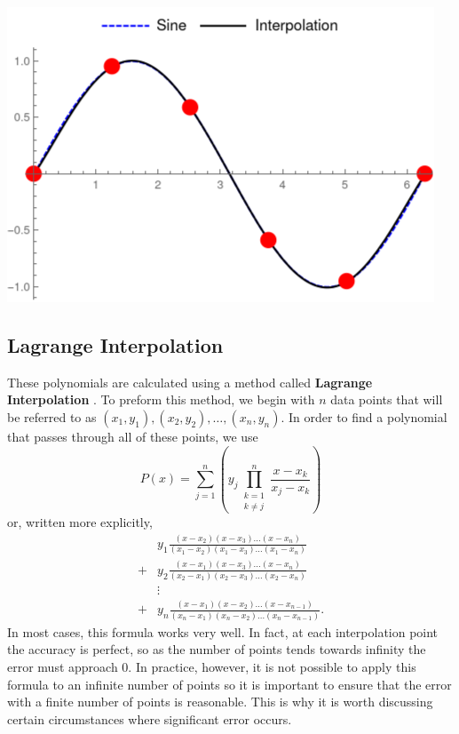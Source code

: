\documentclass{article}
\begin{document}
{\begin{minipage}{0.3\textwidth}
        \includegraphics[width=\linewidth]{Images/SineInterpolation_EvenlySpaced/sin_interpolation_6.png}
        \captionsetup{justification=centering}
    \end{minipage}
}
\medbreak
\subsection{Lagrange Interpolation}

These polynomials are calculated using a method called \textbf{Lagrange Interpolation} \cite{enwiki:lagrange_polynomial}\cite{mathworld:lagrange_polynomial}. To preform this method, we begin with $n$ data points that will be referred to as $(x_1, y_1), (x_2, y_2), \ldots, (x_n, y_n)$. In order to find a polynomial that passes through all of these points, we use
\begin{equation}
    P(x) = \sum_{j=1}^n\left(y_j\prod_{\substack{k=1 \\ k\neq j}}^n \frac{x-x_k}{x_j-x_k} \right)
\end{equation}
or, written more explicitly,
\begin{align*}
      & y_1\frac{(x-x_2)(x-x_3)\ldots(x-x_n)}{(x_1-x_2)(x_1-x_3)\ldots(x_1-x_n)}          \\
    + & y_2\frac{(x-x_1)(x-x_3)\ldots(x-x_n)}{(x_2-x_1)(x_2-x_3)\ldots(x_2-x_n)}          \\
      & \vdots                                                                            \\
    + & y_n\frac{(x-x_1)(x-x_2)\ldots(x-x_{n-1})}{(x_n-x_1)(x_n-x_2)\ldots(x_n-x_{n-1})}.
\end{align*}
In most cases, this formula works very well. In fact, at each interpolation point the accuracy is perfect, so as the number of points tends towards infinity the error must approach 0. In practice, however, it is not possible to apply this formula to an infinite number of points so it is important to ensure that the error with a finite number of points is reasonable. This is why it is worth discussing certain circumstances where significant error occurs.
\end{document}
